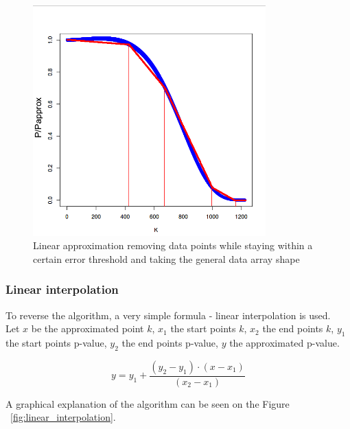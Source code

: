 \documentclass[12pt]{article}
\begin{document}
{\begin{figure}[H]
  \centering
  \includegraphics[width=0.8\textwidth]{linear_approximation}
  \caption{Linear approximation removing data points while staying within a certain error threshold and taking the general data array shape}
  \label{fig:linear_approximation}
\end{figure}

\subsubsection{Linear interpolation}
To reverse the algorithm, a very simple formula - linear interpolation is used.\\
Let $x$ be the approximated point $k$, $x_1$ the start points $k$, $x_2$ the end points $k$, $y_1$ the start points p-value, $y_2$ the end points p-value, $y$ the approximated p-value.

\begin{equation}
  y = y_1 + \frac{(y_2 - y_1) \cdot (x - x_1)}{(x_2 - x_1)}
\end{equation}

A graphical explanation of the algorithm can be seen on the Figure ~\ref{fig:linear_interpolation}.

}
\end{document}
